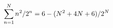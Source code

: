 \documentclass[preview]{standalone}
\begin{document}
\begin{align*}
\special{dvisvgm:raw <g id='unique000'>}\sum_{n=1}^N n^2/2^n=6-(N^2+4N+6)/2^N\special{dvisvgm:raw </g>}
\end{align*}
\end{document}
